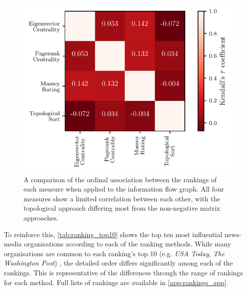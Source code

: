 \begin{figure}[!htbp]
\centering
\includegraphics{chapter4/figs/compare_methods.pdf}
\caption{A comparison of the ordinal association between the rankings of each measure when applied to the information flow graph. All four measures show a limited correlation between each other, with the topological approach differing most from the non-negative matrix approaches.}\label{fig:rank_comparison}
\end{figure}

To reinforce this, \autoref{tab:ranking_top10} shows the top ten most influential news-media organisations according to each of the ranking methods. While many organisations are common to each ranking's top 10 (e.g. \emph{USA Today}, \emph{The Washington Post}) , the detailed order differs significantly among each of the rankings. This is representative of the differences through the range of rankings for each method. Full lists of rankings are available in \autoref{app:rankings_app}.



